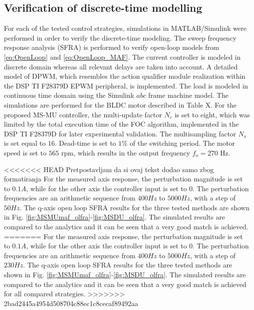 \documentclass[journal]{IEEEtran}
\begin{document}
\subsection{Verification of discrete-time modelling}
For each of the tested control strategies, simulations in MATLAB/Simulink were performed in order to verify the discrete-time modeling. 
The sweep frequency response analysis (SFRA) is performed to verify open-loop models from \eqref{eq:OpenLoop} and \eqref{eq:OpenLoop_MAF}.
The current controller is modeled in discrete domain whereas all relevant delays are taken into account. A detailed model of DPWM, which resembles the action qualifier module realization within the DSP TI F28379D EPWM peripheral, is implemented. The load is modeled in continuous time domain using the Simulink $abc$ frame machine model. The simulations are performed for the BLDC motor described in Table X. For the proposed MS-MU controller, the multi-update factor $N_c$ is set to eight, which was limited by the total execution time of the FOC algorithm, implemented in the DSP TI F28379D for later experimental validation. The multisampling factor $N_s$ is set equal to $16$. Dead-time is set to $1 \%$ of the switching period. The motor speed is set to $565$ rpm, which results in the output frequency $f_o = 270$ Hz.

<<<<<<< HEAD
Pretpostavljam da si ovaj tekst dodao samo zbog formatiranja
For the measured axis response, the perturbation magnitude is set to $0.1 A$, while for the other axis the controller input is set to 0. The perturbation frequencies are an arithmetic sequence from $400 Hz$ to $5000 Hz$, with a step of $50 Hz$. The q-axis open loop SFRA results for the three tested methods are shown in Fig. \ref{fig:MSMUmaf_olfra}-\ref{fig:MSDU_olfra}. The simulated results are compared to the analytics and it can be seen that a very good match is achieved.
=======
For the measured axis response, the perturbation magnitude is set to $0.1 A$, while for the other axis the controller input is set to 0. The perturbation frequencies are an arithmetic sequence from $400 Hz$ to $5000 Hz$, with a step of $230 Hz$. The q-axis open loop SFRA results for the three tested methods are shown in Fig. \ref{fig:MSMUmaf_olfra}-\ref{fig:MSDU_olfra}. The simulated results are compared to the analytics and it can be seen that a very good match is achieved for all compared strategies.
>>>>>>> 2bad2445a4954d508704c88ec1c8cecaf89492aa
\end{document}
